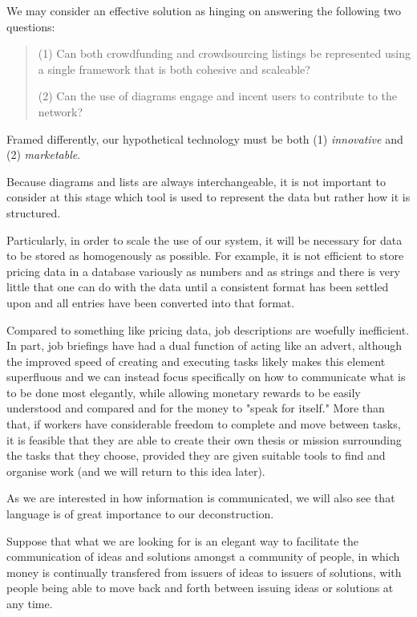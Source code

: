 \documentclass{article}
\begin{document}
\begin{multicols}{2}
We may consider an effective solution as hinging on answering the following two questions:

\begin{quote}
(1) Can both crowdfunding and crowdsourcing listings be represented using a single framework that is both cohesive and scaleable?

(2) Can the use of diagrams engage and incent users to contribute to the network?

\end{quote}
Framed differently, our hypothetical technology must be both (1) \emph{innovative} and (2) \emph{marketable}.

Because diagrams and lists are always interchangeable, it is not important to consider at this stage which tool is used to represent the data but rather how it is structured.

Particularly, in order to scale the use of our system, it will be necessary for data to be stored as homogenously as possible. For example, it is not efficient to store pricing data in a database variously as numbers and as strings and there is very little that one can do with the data until a consistent format has been settled upon and all entries have been converted into that format.

Compared to something like pricing data, job descriptions are woefully inefficient. In part, job briefings have had a dual function of acting like an advert, although the improved speed of creating and executing tasks likely makes this element superfluous and we can instead focus specifically on how to communicate what is to be done most elegantly, while allowing monetary rewards to be easily understood and compared and for the money to "speak for itself." More than that, if workers have considerable freedom to complete and move between tasks, it is feasible that they are able to create their own thesis or mission surrounding the tasks that they choose, provided they are given suitable tools to find and organise work (and we will return to this idea later).

As we are interested in how information is communicated, we will also see that language is of great importance to our deconstruction.


Suppose that what we are looking for is an elegant way to facilitate the communication of ideas and solutions amongst a community of people, in which money is continually transfered from issuers of ideas to issuers of solutions, with people being able to move back and forth between issuing ideas or solutions at any time.


\end{multicols}
\end{document}
